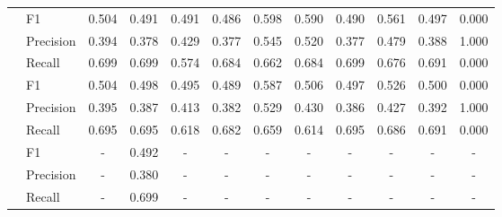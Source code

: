 \begin{tabular}{llcccccccccc}
 & F1 & 0.504 & 0.491 & 0.491 & 0.486 & 0.598 & 0.590 & 0.490 & 0.561 & 0.497 & 0.000 \\
 & Precision & 0.394 & 0.378 & 0.429 & 0.377 & 0.545 & 0.520 & 0.377 & 0.479 & 0.388 & 1.000 \\
 & Recall & 0.699 & 0.699 & 0.574 & 0.684 & 0.662 & 0.684 & 0.699 & 0.676 & 0.691 & 0.000 \\
\cline{1-12}
 & F1 & 0.504 & 0.498 & 0.495 & 0.489 & 0.587 & 0.506 & 0.497 & 0.526 & 0.500 & 0.000 \\
 & Precision & 0.395 & 0.387 & 0.413 & 0.382 & 0.529 & 0.430 & 0.386 & 0.427 & 0.392 & 1.000 \\
 & Recall & 0.695 & 0.695 & 0.618 & 0.682 & 0.659 & 0.614 & 0.695 & 0.686 & 0.691 & 0.000 \\
\cline{1-12}
 & F1 & - & 0.492 & - & - & - & - & - & - & - & - \\
 & Precision & - & 0.380 & - & - & - & - & - & - & - & - \\
 & Recall & - & 0.699 & - & - & - & - & - & - & - & - \\
\cline{1-12}
\bottomrule
\end{tabular}
